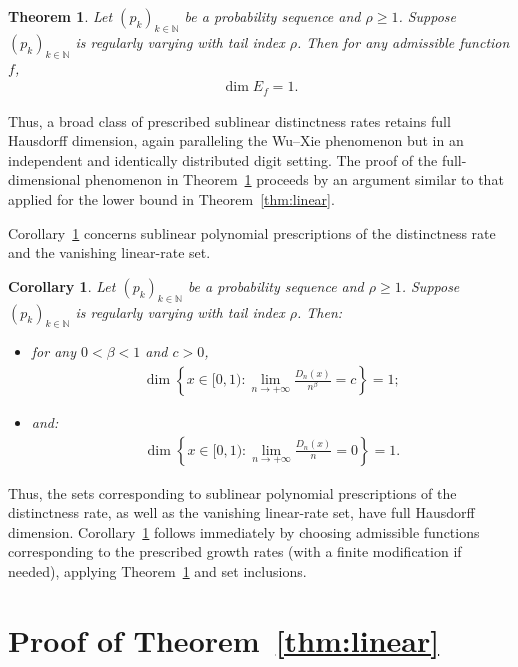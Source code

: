 \documentclass[12pt,reqno]{amsart}
\theoremstyle{definition}
\theoremstyle{plain}
\newtheorem{thm}{Theorem}
\newtheorem{coro}{Corollary}
\begin{document}
\begin{thm}\label{thm:sublinear}
Let $(p_k)_{k\in\mathbb{N}}$ be a probability sequence and $\rho\geq 1$.
Suppose $(p_k)_{k\in\mathbb{N}}$ is regularly varying with tail index $\rho$.
Then for any admissible function $f$, 
\begin{align*}
    \dim{E_f}=1.
\end{align*}
\end{thm}
Thus, a broad class of prescribed sublinear distinctness rates retains full Hausdorff dimension, again paralleling the Wu--Xie phenomenon but in an independent and identically distributed digit setting. The proof of the full-dimensional phenomenon in Theorem~\ref{thm:sublinear} proceeds by an argument similar to that applied for the lower bound in Theorem~\ref{thm:linear}.

Corollary~\ref{cor:poly-phase} concerns sublinear polynomial prescriptions of the distinctness rate and the vanishing linear-rate set.
\begin{coro}\label{cor:poly-phase}
Let $(p_k)_{k\in\mathbb{N}}$ be a probability sequence and $\rho\geq 1$.
Suppose $(p_k)_{k\in\mathbb{N}}$ is regularly varying with tail index $\rho$.
Then:
\begin{itemize}
    \item for any $0<\beta<1$ and $c>0$, 
    \begin{align*}
        \dim{\left\{x\in[0,1):\lim_{n\to+\infty}\frac{D_n(x)}{n^\beta}=c\right\}}
        =1;
    \end{align*}
    \item and:
    \begin{align*}
        \dim{\left\{x\in[0,1):\lim_{n\to+\infty}\frac{D_n(x)}{n}=0\right\}}
        =1.
    \end{align*}
\end{itemize}
\end{coro}
Thus, the sets corresponding to sublinear polynomial prescriptions of the distinctness rate, as well as the vanishing linear-rate set, have full Hausdorff dimension. Corollary~\ref{cor:poly-phase} follows immediately by choosing admissible functions corresponding to the prescribed growth rates (with a finite modification if needed), applying Theorem~\ref{thm:sublinear} and set inclusions.

\section{Proof of Theorem~\ref{thm:linear}}
\end{document}
